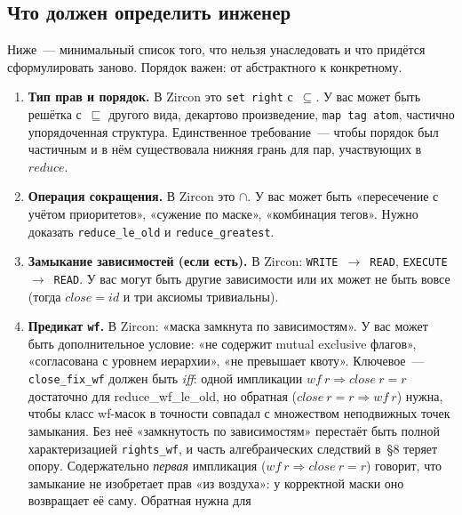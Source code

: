 \documentclass[11pt,a4paper]{article}
\newcommand{\isabel}[1]{{\isabelleit #1}}
\newcommand{\lemmaname}[1]{\isabel{#1}}
\begin{document}
\subsection{Что должен определить инженер}
\label{sec:port-checklist}

Ниже~--- минимальный список того, что нельзя унаследовать и что придётся
сформулировать заново. Порядок важен: от абстрактного к конкретному.

\begin{enumerate}[leftmargin=1.4em]
	\item \textbf{Тип прав и порядок.}
	      В Zircon это \texttt{set right} с~$\subseteq$. У вас может быть
	      решётка с~$\sqsubseteq$ другого вида, декартово произведение,
	      \texttt{map tag atom}, частично упорядоченная структура.
	      Единственное требование~--- чтобы порядок был частичным и в нём
	      существовала нижняя грань для пар, участвующих в~$\mathit{reduce}$.
	\item \textbf{Операция сокращения.}
	      В Zircon это $\cap$. У вас может быть «пересечение с учётом
	      приоритетов», «сужение по маске», «комбинация тегов». Нужно
	      доказать \texttt{reduce\_le\_old} и \texttt{reduce\_greatest}.
	\item \textbf{Замыкание зависимостей (если есть).}
	      В Zircon: \texttt{WRITE}~$\to$~\texttt{READ},
	      \texttt{EXECUTE}~$\to$~\texttt{READ}. У вас могут быть другие
	      зависимости или их может не быть вовсе (тогда
	      $\mathit{close} = \mathit{id}$ и три аксиомы тривиальны).
	\item \textbf{Предикат \texttt{wf}.}
	      В Zircon: «маска замкнута по зависимостям». У вас может быть
	      дополнительное условие: «не содержит mutual exclusive флагов»,
	      «согласована с уровнем иерархии», «не превышает квоту».
	      Ключевое~--- \texttt{close\_fix\_wf} должен быть \emph{iff}: одной
	      импликации $\mathit{wf}\ r \Longrightarrow \mathit{close}\ r = r$
	      достаточно для \lemmaname{reduce\_wf\_le\_old}, но обратная
	      ($\mathit{close}\ r = r \Longrightarrow \mathit{wf}\ r$) нужна,
	      чтобы класс wf-масок в точности совпадал с множеством неподвижных
	      точек замыкания. Без неё «замкнутость по зависимостям» перестаёт
	      быть полной характеризацией \texttt{rights\_wf}, и часть
	      алгебраических следствий в~§8 теряет опору.
	      Содержательно \emph{первая} импликация
	      ($\mathit{wf}\ r \Longrightarrow \mathit{close}\ r = r$)
	      говорит, что замыкание не изобретает прав «из воздуха»: у
	      корректной маски оно возвращает её саму. Обратная нужна для

\end{enumerate}
\end{document}
